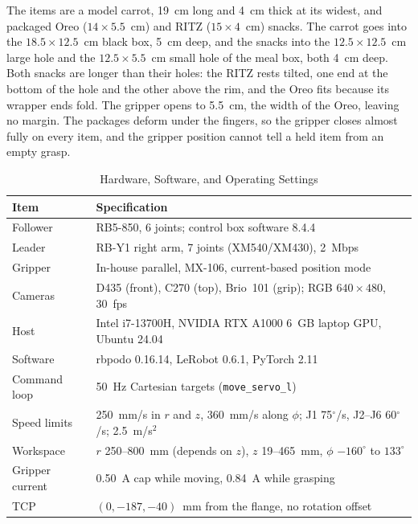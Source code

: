 The items are a model carrot, 19~cm long and 4~cm thick at its widest, and
packaged Oreo ($14\times5.5$~cm) and RITZ ($15\times4$~cm) snacks. The carrot
goes into the $18.5\times12.5$~cm black box, 5~cm deep, and the snacks into the
$12.5\times12.5$~cm large hole and the $12.5\times5.5$~cm small hole of the
meal box, both 4~cm deep. Both snacks are longer than their holes: the RITZ
rests tilted, one end at the bottom of the hole and the other above the rim,
and the Oreo fits because its wrapper ends fold. The gripper opens to 5.5~cm,
the width of the Oreo, leaving no margin. The packages deform under the
fingers, so the gripper closes almost fully on every item, and the gripper
position cannot tell a held item from an empty grasp.

\begin{table}[t]
\caption{Hardware, Software, and Operating Settings}
\label{tab:hardware}
\centering
\footnotesize
\setlength{\tabcolsep}{3pt}
\begin{tabular}{@{}lp{}@{}}
\toprule
Item & Specification\\
\midrule
Follower & RB5-850, 6 joints; control box software 8.4.4\\
Leader & RB-Y1 right arm, 7 joints (XM540/XM430), 2~Mbps\\
Gripper & In-house parallel, MX-106, current-based position mode\\
Cameras & D435 (front), C270 (top), Brio~101 (grip); RGB $640\times480$, 30~fps\\
Host & Intel i7-13700H, NVIDIA RTX A1000 6~GB laptop GPU, Ubuntu 24.04\\
Software & rbpodo 0.16.14, LeRobot 0.6.1, PyTorch 2.11\\
Command loop & 50~Hz Cartesian targets (\texttt{move\_servo\_l})\\
Speed limits & 250~mm/s in $r$ and $z$, 360~mm/s along $\phi$;
J1 75$^\circ$/s, J2--J6 60$^\circ$/s; 2.5~m/s$^2$\\
Workspace & $r$ 250--800~mm (depends on $z$), $z$ 19--465~mm,
$\phi$ $-160^\circ$ to $133^\circ$\\
Gripper current & 0.50~A cap while moving, 0.84~A while grasping\\
TCP & $(0,-187,-40)$~mm from the flange, no rotation offset\\
\bottomrule
\end{tabular}
\end{table}

